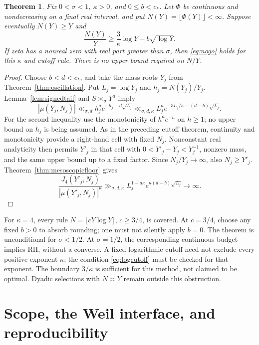 \documentclass[11pt,a4paper]{article}
\newtheorem{theorem}{Theorem}[section]
\theoremstyle{definition}
\theoremstyle{remark}
\begin{document}
\begin{theorem}\label{thm:logcutoff}
Fix \(0<\sigma<1\), \(\kappa>0\), and \(0\le b<c_*\).
Let \(\Phi\) be continuous and nondecreasing on a final real
interval, and put \(N(Y)=\lfloor\Phi(Y)\rfloor<\infty\).
Suppose eventually \(N(Y)\ge Y\) and
\begin{equation}
 \frac{N(Y)}Y\ge \frac3\kappa\log Y-b\sqrt{\log Y}.
 \label{eq:logcutoff}
\end{equation}
If zeta has a nonreal zero with real part greater than \(\sigma\),
then \eqref{eq:nogo} holds for this \(\kappa\) and cutoff rule.
There is no upper bound required on \(N/Y\).
\end{theorem}
\begin{proof}
Choose \(b<d<c_*\), and take the mass roots \(Y_j\) from
Theorem~\ref{thm:oscillation}. Put \(L_j=\log Y_j\) and
\(h_j=N(Y_j)/Y_j\).
Lemma~\ref{lem:signedtail} and \(S\asymp_\sigma Y^a\) imply
\[
 |\mu(Y_j,N_j)|\ll_{\sigma,d}h_j^ae^{-h_j-d\sqrt{L_j}}
 \ll_{\sigma,d,\kappa}
 L_j^a e^{-3L_j/\kappa-(d-b)\sqrt{L_j}}.
\]
For the second inequality use the monotonicity of \(h^ae^{-h}\)
on \(h\ge1\); no upper bound on \(h_j\) is being assumed.
As in the preceding cutoff theorem, continuity and monotonicity
provide a right-hand cell with fixed \(N_j\). Nonconstant
real analyticity then permits \(Y'_j\) in that cell with
\(0<Y'_j-Y_j<Y_j^{-1}\), nonzero mass, and the same upper bound
up to a fixed factor. Since \(N_j/Y_j\to\infty\), also \(N_j\ge Y'_j\).
Theorem~\ref{thm:mesoscopicfloor} gives
\[
 \frac{J_4(Y'_j,N_j)}{|\mu(Y'_j,N_j)|^\kappa}
 \gg_{\sigma,d,\kappa}
 L_j^{1-a\kappa}
 e^{\kappa(d-b)\sqrt{L_j}}\longrightarrow\infty .
\]
\end{proof}

For \(\kappa=4\), every rule \(N=\lfloor cY\log Y\rfloor\),
\(c\ge3/4\), is covered. At \(c=3/4\), choose any fixed \(b>0\)
to absorb rounding; one must not silently apply \(b=0\).
The theorem is unconditional for \(\sigma<1/2\). At
\(\sigma=1/2\), the corresponding continuous budget implies RH,
without a converse. A fixed logarithmic cutoff need not exclude
every positive exponent \(\kappa\); the condition
\eqref{eq:logcutoff} must be checked for that exponent.
The boundary \(3/\kappa\) is sufficient for this method, not claimed
to be optimal. Dyadic selections with \(N\asymp Y\) remain outside
this obstruction.

\section{Scope, the Weil interface, and reproducibility}
\end{document}
